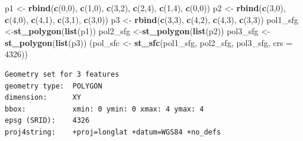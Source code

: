 \documentclass[]{book}
\newenvironment{Shaded}{\begin{snugshade}}{\end{snugshade}}
\newcommand{\KeywordTok}[1]{\textcolor[rgb]{0.13,0.29,0.53}{\textbf{#1}}}
\newcommand{\DataTypeTok}[1]{\textcolor[rgb]{0.13,0.29,0.53}{#1}}
\newcommand{\DecValTok}[1]{\textcolor[rgb]{0.00,0.00,0.81}{#1}}
\newcommand{\StringTok}[1]{\textcolor[rgb]{0.31,0.60,0.02}{#1}}
\newcommand{\NormalTok}[1]{#1}
\begin{document}
\begin{Shaded}
\begin{Highlighting}[]
\NormalTok{p1 <-}\StringTok{ }\KeywordTok{rbind}\NormalTok{(}\KeywordTok{c}\NormalTok{(}\DecValTok{0}\NormalTok{,}\DecValTok{0}\NormalTok{), }\KeywordTok{c}\NormalTok{(}\DecValTok{1}\NormalTok{,}\DecValTok{0}\NormalTok{), }\KeywordTok{c}\NormalTok{(}\DecValTok{3}\NormalTok{,}\DecValTok{2}\NormalTok{), }\KeywordTok{c}\NormalTok{(}\DecValTok{2}\NormalTok{,}\DecValTok{4}\NormalTok{), }\KeywordTok{c}\NormalTok{(}\DecValTok{1}\NormalTok{,}\DecValTok{4}\NormalTok{), }\KeywordTok{c}\NormalTok{(}\DecValTok{0}\NormalTok{,}\DecValTok{0}\NormalTok{))}
\NormalTok{p2 <-}\StringTok{ }\KeywordTok{rbind}\NormalTok{(}\KeywordTok{c}\NormalTok{(}\DecValTok{3}\NormalTok{,}\DecValTok{0}\NormalTok{), }\KeywordTok{c}\NormalTok{(}\DecValTok{4}\NormalTok{,}\DecValTok{0}\NormalTok{), }\KeywordTok{c}\NormalTok{(}\DecValTok{4}\NormalTok{,}\DecValTok{1}\NormalTok{), }\KeywordTok{c}\NormalTok{(}\DecValTok{3}\NormalTok{,}\DecValTok{1}\NormalTok{), }\KeywordTok{c}\NormalTok{(}\DecValTok{3}\NormalTok{,}\DecValTok{0}\NormalTok{))}
\NormalTok{p3 <-}\StringTok{ }\KeywordTok{rbind}\NormalTok{(}\KeywordTok{c}\NormalTok{(}\DecValTok{3}\NormalTok{,}\DecValTok{3}\NormalTok{), }\KeywordTok{c}\NormalTok{(}\DecValTok{4}\NormalTok{,}\DecValTok{2}\NormalTok{), }\KeywordTok{c}\NormalTok{(}\DecValTok{4}\NormalTok{,}\DecValTok{3}\NormalTok{), }\KeywordTok{c}\NormalTok{(}\DecValTok{3}\NormalTok{,}\DecValTok{3}\NormalTok{))}
\NormalTok{pol1_sfg <-}\KeywordTok{st_polygon}\NormalTok{(}\KeywordTok{list}\NormalTok{(p1))}
\NormalTok{pol2_sfg <-}\KeywordTok{st_polygon}\NormalTok{(}\KeywordTok{list}\NormalTok{(p2))}
\NormalTok{pol3_sfg <-}\KeywordTok{st_polygon}\NormalTok{(}\KeywordTok{list}\NormalTok{(p3))}
\NormalTok{(pol_sfc <-}\StringTok{ }\KeywordTok{st_sfc}\NormalTok{(pol1_sfg, pol2_sfg, pol3_sfg, }\DataTypeTok{crs =} \DecValTok{4326}\NormalTok{))}
\end{Highlighting}
\end{Shaded}

\begin{verbatim}
Geometry set for 3 features 
geometry type:  POLYGON
dimension:      XY
bbox:           xmin: 0 ymin: 0 xmax: 4 ymax: 4
epsg (SRID):    4326
proj4string:    +proj=longlat +datum=WGS84 +no_defs
\end{verbatim}
\end{document}

